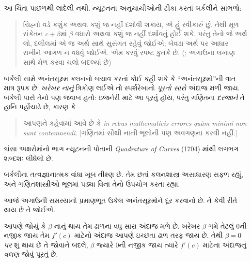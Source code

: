 આ ચિંતા પાછળથી લાદેલી નથી.
ન્યૂટનના અનુયાયીઓની ટીકા કરતાં બર્કલીને સાંભળો:
\begin{quote}
ચિહ્નો વડે કશુંક અથવા કશું જ નહીં દર્શાવી શકાય,
એ હું સ્વીકારું છું. તેથી મૂળ સંકેતન
$c + \beta$માં $\beta$ વધારો અથવા કશું જ નહીં
દર્શાવતું હોઈ શકે. પરંતુ તેનો જે અર્થ લો,
દલીલમાં એ જ અર્થ સાથે સુસંગત રહેવું જોઈએ;
બેવડા અર્થ પર આધાર રાખીને આગળ ન વધવું જોઈએ.
એમ કરવું સ્પષ્ટ કુતર્ક છે.
(\citealt[\S{}XIII]{Berkeley1734};
અગાઉના લખાણ સાથે મેળ કરવા ચલો બદલ્યાં છે)
\end{quote}
બર્કલી સામે અનંતસૂક્ષ્મ કલનનો બચાવ કરતાં
કોઈ કહી શકે કે “અનંતસૂક્ષ્મો”ની વાત માત્ર
રૂપક છે: \emph{ખરેખર નાનું} ત્રિકોણ લઈએ
તો સ્પર્શરેખાનો \emph{પૂરતો સારો} અંદાજ
મળી જાય. બર્કલી પાસે તેનો પણ જવાબ હતો:
ઇજનેરી માટે આ પૂરતું હોય, પરંતુ ગણિતના
\emph{દરજાને} તે હાનિ પહોંચાડે છે, કારણ કે
\begin{quote}
આપણને કહેવામાં આવે છે કે
\emph{in rebus mathematicis errores qu\`{a}m minimi
non sunt contemnendi}. [ગણિતમાં સૌથી નાની
ભૂલોની પણ અવગણના કરવી નહીં.]
\citep[\S{}IX]{Berkeley1734}
\end{quote}
ત્રાંસા અક્ષરોમાંનો ભાગ ન્યૂટનની પોતાની
\emph{Quadrature of Curves} (1704)
માંથી લગભગ શબ્દશઃ લીધેલો છે.

બર્કલીના તત્વજ્ઞાનાત્મક વાંધા ખૂબ
તીક્ષ્ણ છે. તેમ છતાં કલનશાસ્ત્ર
અસાધારણ સફળ રહ્યું, અને ગણિતશાસ્ત્રીઓ
ભૂલમાં પડ્યા વિના તેનો ઉપયોગ કરતા રહ્યા.
\endgroup

\begingroup
\makeatletter{}\makeatother


\label{guunit:OLP-0635}

	
આજે અગાઉની સમસ્યાનો પ્રમાણભૂત ઉકેલ
અનંતસૂક્ષ્મોને દૂર કરવાનો છે. તે કેવી રીતે થાય છે તે જોઈએ.

આપણે જોયું કે $\beta$ નાનું થાય તેમ ઢાળના વધુ સારા
અંદાજ મળે છે. ખરેખર $\beta$ ગમે તેટલું
$0$ની નજીક જાય તેમ $f'(c)$ માટેનો અંદાજ
આપણે ઇચ્છતા ઢાળ તરફ જાય છે. તેથી
$\beta = 0$ \emph{પર} શું થાય છે તે
જોવાને બદલે, $\beta$ જ્યારે $0$ની નજીક
જાય ત્યારે $f'(c)$ માટેના અંદાજનું
\emph{વલણ} જોવું પૂરતું છે.

